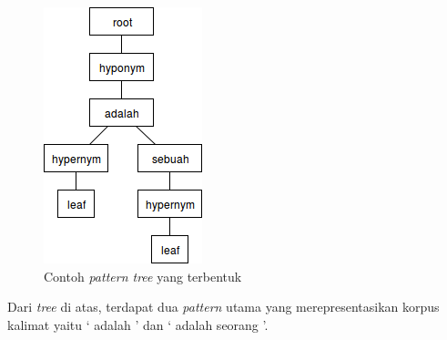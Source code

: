 \begin{figure}
    \centering
    \includegraphics[width=\linewidth]{pics/contoh-patterntree}
    \caption{Contoh \textit{pattern tree} yang terbentuk}
    \label{fig:contoh-ptree}
\end{figure}

\noindent Dari \textit{tree} di atas, terdapat dua \textit{pattern} utama yang merepresentasikan korpus kalimat yaitu `{\tagHyponym} adalah {\tagHypernym}' dan `{\tagHyponym} adalah seorang {\tagHypernym}'.

